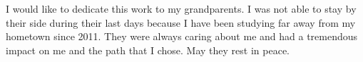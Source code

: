 I would like to dedicate this work to my grandparents. I was not able to stay by their side during their last days because I have been studying far away from my hometown since 2011. They were always caring about me and had a tremendous impact on me and the path that I chose. May they rest in peace.